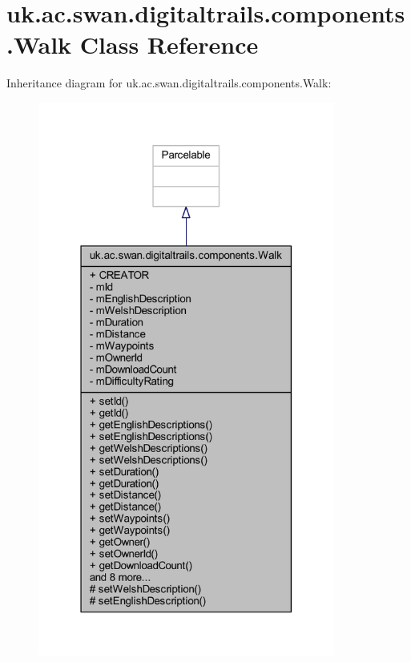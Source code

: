 \hypertarget{classuk_1_1ac_1_1swan_1_1digitaltrails_1_1components_1_1_walk}{\section{uk.\+ac.\+swan.\+digitaltrails.\+components.\+Walk Class Reference}
\label{classuk_1_1ac_1_1swan_1_1digitaltrails_1_1components_1_1_walk}
}


Inheritance diagram for uk.\+ac.\+swan.\+digitaltrails.\+components.\+Walk\+:
\nopagebreak
\begin{figure}[H]
\begin{center}
\leavevmode
\includegraphics[width=277pt]{classuk_1_1ac_1_1swan_1_1digitaltrails_1_1components_1_1_walk__inherit__graph}
\end{center}
\end{figure}


